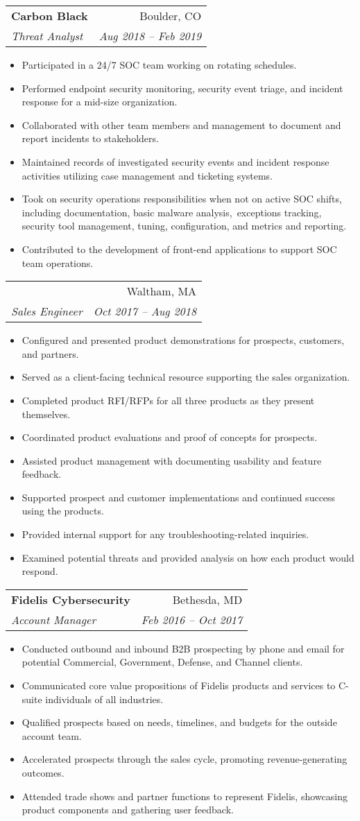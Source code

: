 \documentclass[letterpaper,11pt]{article}
\makeatletter
\newcommand{\resumeSubheading}[4]{
  \vspace{-1pt}\item
    \begin{tabular*}{0.97\textwidth}[t]{l@{\extracolsep{\fill}}r}
      \textbf{#1} & #2 \\
      \textit{\small#3} & \textit{\small #4} \\
    \end{tabular*}\vspace{-5pt}
}
\newcommand{\resumeSubSubheading}[4]{
  \vspace{2pt}
    \begin{tabular*}{0.97\textwidth}[t]{l@{\extracolsep{\fill}}r}
      #1 & #2 \\
      \textit{\small#3} & \textit{\small#4} \\
    \end{tabular*}\vspace{-5pt}
}
\newcommand{\resumeItemListStart}{\begin{itemize}[nosep]}
\newcommand{\resumeItemListEnd}{\end{itemize}\vspace{-5pt}}
\makeatother
\begin{document}
\resumeSubheading
{Carbon Black}{Boulder, CO}
{Threat Analyst}{Aug 2018 -- Feb 2019}
\resumeItemListStart
\item Participated in a 24/7 SOC team working on rotating schedules.
\item Performed endpoint security monitoring, security event triage, and incident response for a mid-size organization.
\item Collaborated with other team members and management to document and report incidents to stakeholders.
\item Maintained records of investigated security events and incident response activities utilizing case management and ticketing systems.
\item Took on security operations responsibilities when not on active SOC shifts, including documentation, basic malware analysis,\
exceptions tracking, security tool management, tuning, configuration, and metrics and reporting.
\item Contributed to the development of front-end applications to support SOC team operations.
\resumeItemListEnd

\break
\resumeSubSubheading
{}{Waltham, MA}
{Sales Engineer}{Oct 2017 -- Aug 2018}
\resumeItemListStart
\item Configured and presented product demonstrations for prospects, customers, and partners.
\item Served as a client-facing technical resource supporting the sales organization.
\item Completed product RFI/RFPs for all three products as they present themselves.
\item Coordinated product evaluations and proof of concepts for prospects.
\item Assisted product management with documenting usability and feature feedback.
\item Supported prospect and customer implementations and continued success using the products.
\item Provided internal support for any troubleshooting-related inquiries.
\item Examined potential threats and provided analysis on how each product would respond.
\resumeItemListEnd

\resumeSubheading
{Fidelis Cybersecurity}{Bethesda, MD}
{Account Manager}{Feb 2016 -- Oct 2017}
\resumeItemListStart
\item Conducted outbound and inbound B2B prospecting by phone and email for potential Commercial, Government, Defense, and Channel clients.
\item Communicated core value propositions of Fidelis products and services to C-suite individuals of all industries.
\item Qualified prospects based on needs, timelines, and budgets for the outside account team.
\item Accelerated prospects through the sales cycle, promoting revenue-generating outcomes.
\item Attended trade shows and partner functions to represent Fidelis, showcasing product components and gathering user feedback.
\resumeItemListEnd
\end{document}

